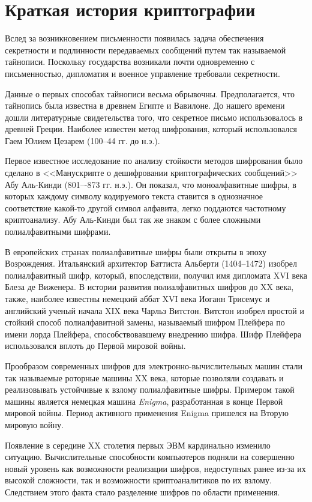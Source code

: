 \section{Краткая история криптографии}

Вслед за возникновением письменности появилась задача обеспечения секретности и подлинности передаваемых сообщений путем так называемой тайнописи. Поскольку государства возникали почти одновременно с письменностью, дипломатия и военное управление требовали секретности.

Данные о первых способах тайнописи весьма обрывочны. Предполагается, что тайнопись была известна в древнем Египте и Вавилоне. До нашего времени дошли литературные свидетельства того, что  секретное письмо использовалось в древней Греции. Наиболее известен метод шифрования, который использовался Гаем Юлием Цезарем (100--44 гг. до н.э.).

Первое известное исследование по анализу стойкости методов шифрования было сделано в <<Манускрипте о дешифровании криптографических сообщений>> Абу Аль-Кинди (801–-873 гг. н.э.). Он показал, что моноалфавитные шифры, в которых каждому символу кодируемого текста ставится в однозначное соответствие  какой-то другой символ алфавита, легко поддаются частотному криптоанализу. Абу Аль-Кинди был так же знаком с более сложными полиалфавитными шифрами.

В европейских странах полиалфавитные шифры были открыты в эпоху Возрождения. Итальянский архитектор Баттиста Альберти (1404--1472) изобрел полиалфавитный шифр, который, впоследствии, получил имя дипломата XVI века Блеза де Виженера. В истории развития полиалфавитных шифров до XX века, также, наиболее известны немецкий аббат XVI века Иоганн Трисемус и английский ученый начала XIX века Чарльз Витстон. Витстон изобрел простой и стойкий способ полиалфавитной замены, называемый шифром Плейфера по имени лорда Плейфера, способствовавшему внедрению шифра. Шифр Плейфера использовался вплоть до Первой мировой войны.

Прообразом современных шифров для электронно-вычислительных машин стали так называемые роторные машины XX века, которые позволяли создавать и реализовывать устойчивые к взлому полиалфавитные шифры. Примером такой машины является немецкая машина \emph{Enigma}, разработанная в конце Первой мировой войны. Период активного применения Enigma пришелся на Вторую мировую войну.

Появление в середине  XX столетия первых ЭВМ кардинально изменило ситуацию. Вычислительные способности компьютеров подняли на совершенно новый уровень как возможности реализации шифров, недоступных ранее из-за их высокой сложности, так и возможности криптоаналитиков по их взлому. Следствием этого факта стало разделение шифров по области применения.

